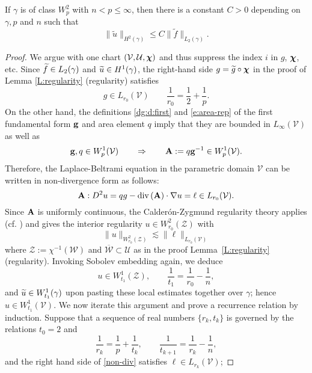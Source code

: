 \begin{lemma}\label{L:regularity-W2p}
If $\gamma$ is of class $W^2_p$ with $n<p\le\infty$, then there is a constant
$C>0$ depending on $\gamma, p$ and $n$ such that
%
\begin{equation}\label{regularity-W2p}
\|\widetilde u\|_{H^2(\gamma)} \le C \|\widetilde f\|_{L_2(\gamma)}.  
\end{equation}
%
\end{lemma}    
%
\begin{proof}
We argue with one chart $(\mathcal{V},\mathcal{U},{\boldsymbol \chi})$ and thus suppress the index $i$ in $g$, ${\boldsymbol \chi}$, etc. Since $\widetilde{f}\in L_2(\gamma)$ and
$\widetilde{u}\in H^1(\gamma)$, the right-hand side $g=\widetilde g\circ{\boldsymbol \chi}$ 
in the proof of Lemma \ref{L:regularity} (regularity) satisfies
%
\[
g \in L_{r_0}(\mathcal{V}) \qquad
\frac{1}{r_0} = \frac{1}{2} + \frac{1}{p}.
\]
%
On the other hand, the definitions \eqref{dg:d:first} and \eqref{e:area-rep} of
the first fundamental form ${\bf g}$ and area element $q$ imply that they are bounded
in $L_\infty(\mathcal{V})$ as well as
%
\[
{\bf g}, q \in W^1_p(\mathcal{V})
\qquad\Rightarrow\qquad
{\bf A} := q {\bf g}^{-1} \in W^1_p(\mathcal{V}).
\]
%
Therefore, the Laplace-Beltrami equation in the parametric domain $\mathcal{V}$
can be written in non-divergence form as follows:
%
\begin{equation}\label{non-div}
{\bf A} : D^2 u = q g - \mathrm{div}\left( {\bf A} \right) \cdot \nabla u = \ell \in L_{r_0}(\mathcal{V}).
\end{equation}
%
Since ${\bf A}$ is uniformly continuous, the Calder\'on-Zygmund regularity theory
applies (cf. \cite[Theorem 9.15 and Lemma 9.17]{GT98}) and gives the interior regularity $u\in W^2_{r_0}(\mathcal{Z})$ with
%
\[
\|u\|_{W^2_{r_0}(\mathcal{Z})} \lesssim \|\ell\|_{L_{r_0}(\mathcal{V})}
\]
%
where $\mathcal{Z}:=\chi^{-1}(\mathcal{W})$ and $\overline{\mathcal{W}}\subset \mathcal U$ as in the proof Lemma~\ref{L:regularity} (regularity). Invoking Sobolev embedding again,
we deduce
%
\[
u \in W^1_{t_1}(\mathcal{Z}), \qquad
\frac{1}{t_1} = \frac{1}{r_0} - \frac{1}{n},
\]
%
and $\widetilde{u} \in W^1_{t_1}(\gamma)$ upon pasting these local estimates together over $\gamma$;
hence $u\in W^1_{t_1}(\mathcal{V})$.
We now iterate this argument and prove a recurrence relation by induction. Suppose that
a sequence of real numbers $\{r_k,t_k\}$ is governed by the relations $t_0=2$ and
%
\[
\frac{1}{r_k} = \frac{1}{p} + \frac{1}{t_k},
\qquad
\frac{1}{t_{k+1}} = \frac{1}{r_k} - \frac{1}{n},
\]
%
and the right hand side of \eqref{non-div} satisfies $\ell \in L_{r_k}(\mathcal{V})$;

\end{proof}
